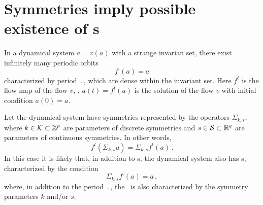 

\section{Symmetries imply possible existence of \rpo s}
\label{sec:SymRPO}
In a dynamical system $\dot{a} = v(a)$ with a strange invarian set, there exist
infinitely many periodic orbits
\[ f^\period{}(a) = a \]
characterized by period $\period{}$, which are dense within the invariant set.
Here $f^t$ is the flow map of the flow $v$, \ie, $a(t) = f^t(a)$ is the
solution of the flow $v$ with initial condition $a(0) = a$.

Let the dynamical system have symmetries represented by the operators
$\Sigma_{k,s}$, where $k \in {\cal K} \subset \mathbb{Z}^p$ are
parameters of discrete symmetries and $s \in {\cal S} \subset \mathbb{R}^q$
are parameters of continuous symmetries.  In other words,
\[ f^t(\Sigma_{k,s} a) = \Sigma_{k,s} f^t(a)\,. \]
In this case it is likely that, in addition to \po s, the dynamical system also
has \rpo s, characterized by the condition
\[ \Sigma_{k,s}f^\period{}(a) = a\,, \]
where, in addition to the period $\period{}$, the \rpo\ is also characterized by
the symmetry parameters $k$ and/or $s$.

